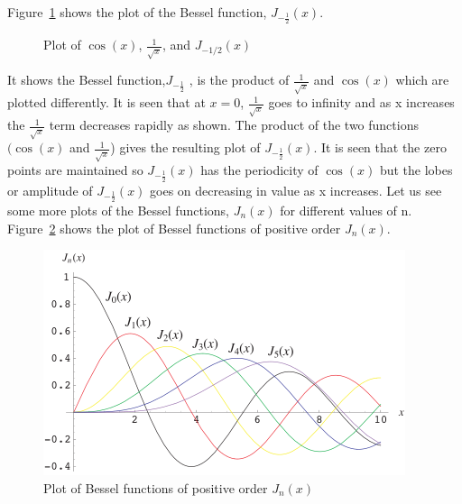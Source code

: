 Figure~\ref{fig:fig-1} shows the plot of the Bessel function, $ J_{-\frac{1}{2}}(x)$.
\begin{figure}[h]
\centering
{}
\caption{Plot of $\cos(x)$, $\frac{1}{\sqrt{x}}$, and $J_{-1/2}(x)$}
\label{fig:fig-1}
\end{figure}

It shows the Bessel function,$J_{-\frac{1}{2}}$ , is the product of $\frac{1}{\sqrt{x}}$ and $\cos(x)$ which are plotted differently. It is seen that at $x=0$, $\frac{1}{\sqrt{x}}$ goes to infinity and as x increases the $\frac{1}{\sqrt{x}}$ term decreases rapidly as shown. The product of the two functions $(\cos(x)$ and $\frac{1}{\sqrt{x}}$) gives the resulting plot of $J_{-\frac{1}{2}}(x)$. It is seen that the zero points are maintained so $J_{-\frac{1}{2}}(x)$ has the periodicity of $\cos(x)$ but the lobes or amplitude of $J_{-\frac{1}{2}}(x)$ goes on decreasing in value as x increases. Let us see some more plots of the Bessel functions, $J_n(x)$ for different values of n. Figure~\ref{fig:bessel-functions} shows the plot of Bessel functions of positive order $J_{n}(x)$.
\begin{figure}[h]
\centering
\includegraphics[width=1\linewidth]{./graphics/BesselJ_800}
\caption{Plot of Bessel functions of positive order $J_{n}(x)$}
\label{fig:bessel-functions}
\end{figure}

